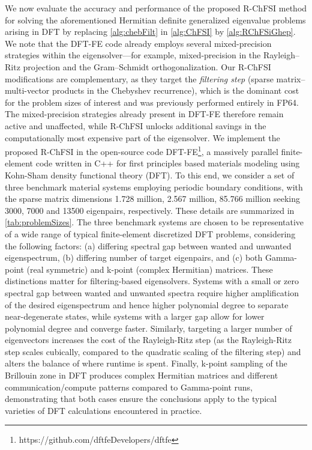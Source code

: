 \documentclass[preprint,3p,number,sort&compress]{elsarticle}
\newcommand{\cblue }{\color{black}}
\newcommand{\cn}{\color{black}}
\begin{document}

We now evaluate the accuracy and performance of the proposed R-ChFSI method for solving the aforementioned Hermitian definite generalized eigenvalue problems arising in DFT by replacing \cref{alg:chebFilt} in \cref{alg:ChFSI} by \cref{alg:RChFSiGhep}. {\cblue We note that the DFT-FE code already employs several mixed-precision strategies within the eigensolver---for example, mixed-precision in the Rayleigh--Ritz projection and the Gram--Schmidt orthogonalization. Our R-ChFSI modifications are complementary, as they target the \emph{filtering step} (sparse matrix--multi-vector products in the Chebyshev recurrence), which is the dominant cost for the problem sizes of interest and was previously performed entirely in FP64. The mixed-precision strategies already present in DFT-FE therefore remain active and unaffected, while R-ChFSI unlocks additional savings in the computationally most expensive part of the eigensolver.\cn} We implement the proposed R-ChFSI in the open-source code DFT-FE\footnote{https://github.com/dftfeDevelopers/dftfe}, a massively parallel finite-element code written in C++ for first principles based materials modeling using Kohn-Sham density functional theory (DFT). To this end, we consider a set of three benchmark material systems employing periodic boundary conditions, with the sparse matrix dimensions 1.728 million, 2.567 million, 85.766 million seeking 3000, 7000 and 13500 eigenpairs, respectively. These details are summarized in \cref{tab:problemSizes}. The three benchmark systems are chosen to be representative of a wide range of typical finite-element discretized DFT problems, considering the following factors: (a) differing spectral gap between wanted and unwanted {\cblue eigenspectrum\cn}, (b) differing number of target eigenpairs, and (c) both Gamma-point (real symmetric) and k-point (complex Hermitian) matrices. These distinctions matter for filtering-based eigensolvers. Systems with a small or zero spectral gap between wanted and unwanted spectra require higher amplification of the desired eigenspectrum and hence higher polynomial degree to separate near-degenerate states, while systems with a larger gap allow for lower polynomial degree and converge faster. Similarly, targeting a larger number of eigenvectors increases the cost of the Rayleigh-Ritz step (as the Rayleigh-Ritz step scales cubically, compared to the quadratic scaling of the filtering step) and alters the balance of where runtime is spent. Finally, k-point sampling of the Brillouin zone in DFT produces complex Hermitian matrices and different communication/compute patterns compared to Gamma-point runs, demonstrating that both cases ensure the conclusions apply to the typical varieties of DFT calculations encountered in practice.
\end{document}
